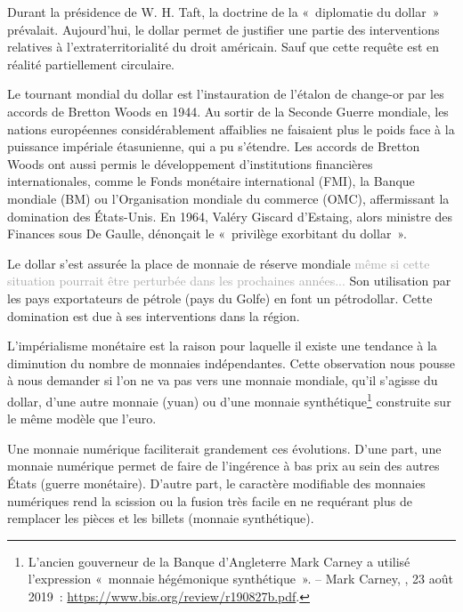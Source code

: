 Durant la présidence de W. H. Taft, la doctrine de la «~diplomatie du dollar~» prévalait. Aujourd'hui, le dollar permet de justifier une partie des interventions relatives à l'extraterritorialité du droit américain. Sauf que cette requête est en réalité partiellement circulaire.

Le tournant mondial du dollar est l'instauration de l'étalon de change-or par les accords de Bretton Woods en 1944. Au sortir de la Seconde Guerre mondiale, les nations européennes considérablement affaiblies ne faisaient plus le poids face à la puissance impériale étasunienne, qui a pu s'étendre. Les accords de Bretton Woods ont aussi permis le développement d'institutions financières internationales, comme le Fonds monétaire international (FMI), la Banque mondiale (BM) ou l'Organisation mondiale du commerce (OMC), affermissant la domination des États-Unis. En 1964, Valéry Giscard d'Estaing, alors ministre des Finances sous De Gaulle, dénonçait le «~privilège exorbitant du dollar~».

Le dollar s'est assurée la place de monnaie de réserve mondiale \textcolor{darkgray}{même si cette situation pourrait être perturbée dans les prochaines années...} Son utilisation par les pays exportateurs de pétrole (pays du Golfe) en font un pétrodollar. Cette domination est due à ses interventions dans la région.


L'impérialisme monétaire est la raison pour laquelle il existe une tendance à la diminution du nombre de monnaies indépendantes. Cette observation nous pousse à nous demander si l'on ne va pas vers une monnaie mondiale, qu'il s'agisse du dollar, d'une autre monnaie (yuan) ou d'une monnaie synthétique\footnote{L'ancien gouverneur de la Banque d'Angleterre Mark Carney a utilisé l'expression «~monnaie hégémonique synthétique~». -- Mark Carney, , 23 août 2019~: \url{https://www.bis.org/review/r190827b.pdf}.} construite sur le même modèle que l'euro. %

Une monnaie numérique faciliterait grandement ces évolutions. D'une part, une monnaie numérique permet de faire de l'ingérence à bas prix au sein des autres États (guerre monétaire). D'autre part, le caractère modifiable des monnaies numériques rend la scission ou la fusion très facile en ne requérant plus de remplacer les pièces et les billets (monnaie synthétique).

